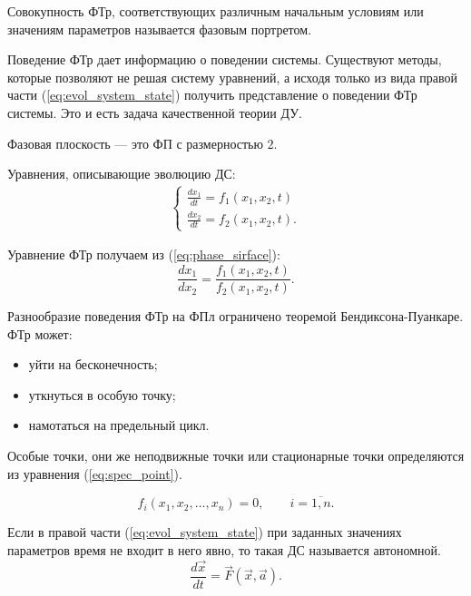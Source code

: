 \begin{definition}
	Совокупность ФТр, соответствующих различным начальным условиям или значениям параметров называется фазовым портретом.
\end{definition}

Поведение ФТр дает информацию о поведении системы. Существуют методы, которые позволяют не решая систему уравнений, а исходя только из вида правой части (\ref{eq:evol_system_state}) получить представление о поведении ФТр системы. Это и есть задача качественной теории ДУ.

\begin{definition}
	Фазовая плоскость --- это ФП с размерностью $2$.
\end{definition}

Уравнения, описывающие эволюцию ДС:
\begin{eqnarray}\label{eq:phase_sirface}
	\begin{cases}
		\frac{dx_1}{dt}=f_1(x_1, x_2, t) \\
		\frac{dx_2}{dt}=f_2(x_1, x_2, t).
	\end{cases}
\end{eqnarray}	

Уравнение ФТр получаем из (\ref{eq:phase_sirface}):
\begin{equation*}
	\frac{dx_1}{dx_2}=\frac{f_1(x_1, x_2, t)}{f_2(x_1, x_2, t)}.
\end{equation*}	

Разнообразие поведения ФТр на ФПл ограничено теоремой Бендиксона-Пуанкаре. ФТр может:
\begin{itemize}
	\item уйти на бесконечность;
	\item уткнуться в особую точку;
	\item намотаться на предельный цикл.
\end{itemize}

Особые точки, они же неподвижные точки или стационарные точки определяются из уравнения (\ref{eq:spec_point}).

\begin{equation}\label{eq:spec_point}
	f_i(x_1, x_2, \ldots, x_n)=0, \qquad i=\overline{1,n}.
\end{equation}	

\begin{definition}[Автономная ДС]
	Если в правой части (\ref{eq:evol_system_state}) при заданных значениях параметров время не входит в него явно, то такая ДС называется автономной.
	\begin{equation*}
		\frac{d\vec{x}}{dt}=\vec{F}(\vec{x}, \vec{a}).
	\end{equation*}
\end{definition}

